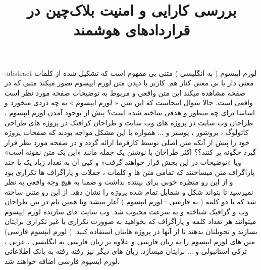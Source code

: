 \documentclass[oneside,openany,mscS]{SBU-Thesis}
\begin{document}
	\title{بررسی کارایی و امنیت بلاک‌چین در قرار‌داد‌های هوشمند}
	
	\subject{مهندسی کامپیوتر}
	
	
	
	
	


	
	
	
	\fa-abstract{
		لورم ایپسوم ( به انگلیسی  ) متنی بی مفهوم است که تشکیل شده از کلمات معنی دار یا بی معنی کنار هم. کاربر با دیدن متن لورم ایپسوم تصور میکند متنی که در صفحه مشاهده میکند این متن واقعی و مربوط به توضیحات صفحه مورد نظر است واقعی است. حالا سوال اینجاست که این متن « لورم ایپسوم » به چه دردی میخورد و اساسا برای چه منظور و هدفی ساخته شده است؟ پیش از بوجود آمدن لورم ایپسوم ، طراحان وب سایت در پروژه های وب سایت و طراحان کرافیک در پروژه های طراحی کاتولوگ ، بروشور ، پوستر و ... همواره با این مشکل مواجه بودند که صفحات پروژه خود را پیش از آنکه متن اصلی توسط کارفرما ارائه گردد و در صفحه مورد نظر قرار گیرد چگونه پر کنند؟؟ اکثر طراحان با نوشتن یک جمله مانند «این یک متن نمونه است» ویا «توضیحات در این بخش قرار خواهند گرفت» و کپی آن به تعداد زیاد یک یا چند پاراگراف متن میساختند که تمامی متن ها و کلمات ، جملات و پاراگراف ها تکراری بود و از این رو منظره خوبی برای بیننده نداشت و ضمنا به هیچ وجه واقعی به نظر نمیرسید تا بتواند شکل و شمایل تمام شده پروژه را نشان دهد. از این رو متنی ساخته شد که با دو کلمه ( به فارسی : لورم ایپسوم ) آغاز میشد وبا همین نام در بین طراحان وب و گرافیک شناخته و به سرعت محبوب شد. وب سایت های سازنده لورم ایپسوم میتوانند هر تعداد کلمه و پاراگراف که بخواهید به صوورت تکراری یا غیر تکراری برایتان بسازند و تحویلتان بدهند تا از آنها در پروژه هایتان استفاده کنید. ( لورم ایپسوم فارسی) متن های لورم ایپسوم را به زبان فارسی و علاوه بر زبان فارسی به انگلیسی ، عربی ، ترکی استانبولی و ... برایتان میسازد. زبان های دیگر نیز رفته رفته به بانک اطلاعاتی لورم ایسپوم فارسی اضافه خواهند شد.  
	}
	
\end{document}
